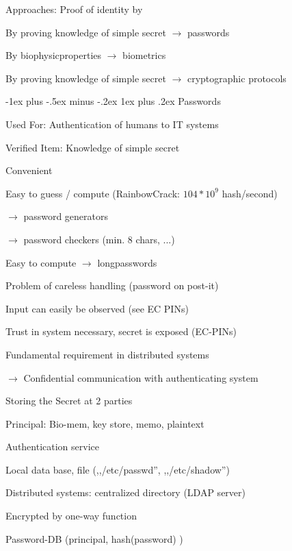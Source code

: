 \documentclass[a4paper]{article}
\makeatletter
\renewcommand{\subsubsection}{\@startsection{subsubsection}{3}{0mm}%
                {-1ex plus -.5ex minus -.2ex}%
                {1ex plus .2ex}%
                {\normalfont\small\bfseries}}
\makeatother
\begin{document}
\begin{multicols}{3}
    Approaches: Proof of identity by
    \begin{itemize*}
        \item By proving knowledge of simple secret $\rightarrow$ passwords
        \item By biophysicproperties $\rightarrow$ biometrics
        \item By proving knowledge of simple secret $\rightarrow$ cryptographic protocols
    \end{itemize*}

    \subsubsection{Passwords}
    \begin{itemize*}
        \item Used For: Authentication of humans to IT systems
        \item Verified Item: Knowledge of simple secret
        \item Convenient
        \item Easy to guess / compute (RainbowCrack: $104*10^9$ hash/second)
        \begin{itemize*}
            \item[$\rightarrow$] password generators
            \item[$\rightarrow$] password checkers (min. 8 chars, ...)
        \end{itemize*}
        \item Easy to compute $\rightarrow$ longpasswords
        \item Problem of careless handling (password on post-it)
        \item Input can easily be observed (see EC PINs)
        \item Trust in system necessary, secret is exposed (EC-PINs)
        \item Fundamental requirement in distributed systems
        \item[$\rightarrow$] Confidential communication with authenticating system
    \end{itemize*}

    Storing the Secret at 2 parties
    \begin{itemize*}
        \item Principal: Bio-mem, key store, memo, plaintext
        \item Authentication service
        \begin{itemize*}
            \item Local data base, file (,,/etc/passwd'', ,,/etc/shadow'')
            \item Distributed systems: centralized directory (LDAP server)
            \item Encrypted by one-way function
            \item Password-DB (principal, hash(password) )
        \end{itemize*}
    \end{itemize*}


\end{multicols}
\end{document}

